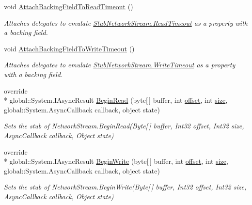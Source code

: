 \begin{DoxyCompactItemize}
void \hyperlink{class_system_1_1_net_1_1_sockets_1_1_fakes_1_1_stub_network_stream_a2c36682e43d87a26e612652ccf69ff8b}{Attach\-Backing\-Field\-To\-Read\-Timeout} ()
\begin{DoxyCompactList}\small\item\em Attaches delegates to emulate \hyperlink{class_system_1_1_net_1_1_sockets_1_1_fakes_1_1_stub_network_stream_a07da6733efea8a3e0ba75ed0d2941729}{Stub\-Network\-Stream.\-Read\-Timeout} as a property with a backing field.\end{DoxyCompactList}\item 
void \hyperlink{class_system_1_1_net_1_1_sockets_1_1_fakes_1_1_stub_network_stream_a041937a175dc32ab4657e21363c9b855}{Attach\-Backing\-Field\-To\-Write\-Timeout} ()
\begin{DoxyCompactList}\small\item\em Attaches delegates to emulate \hyperlink{class_system_1_1_net_1_1_sockets_1_1_fakes_1_1_stub_network_stream_af385e9684d56f2d579d1d7cdc3cbc1db}{Stub\-Network\-Stream.\-Write\-Timeout} as a property with a backing field.\end{DoxyCompactList}\item 
override \\*
global\-::\-System.\-I\-Async\-Result \hyperlink{class_system_1_1_net_1_1_sockets_1_1_fakes_1_1_stub_network_stream_aa4142bafd8af64e0e49e55b722991988}{Begin\-Read} (byte\mbox{[}$\,$\mbox{]} buffer, int \hyperlink{jquery-1_810_82_8js_a4a9f594d20d927164551fc7fa4751a2f}{offset}, int \hyperlink{jquery-1_810_82_8js_afa6806c6ee5e63d5177f1dcc082ba6bc}{size}, global\-::\-System.\-Async\-Callback callback, object state)
\begin{DoxyCompactList}\small\item\em Sets the stub of Network\-Stream.\-Begin\-Read(\-Byte\mbox{[}$\,$\mbox{]} buffer, Int32 offset, Int32 size, Async\-Callback callback, Object state)\end{DoxyCompactList}\item 
override \\*
global\-::\-System.\-I\-Async\-Result \hyperlink{class_system_1_1_net_1_1_sockets_1_1_fakes_1_1_stub_network_stream_a2f2303ff2f072d001202f08d42c03bd4}{Begin\-Write} (byte\mbox{[}$\,$\mbox{]} buffer, int \hyperlink{jquery-1_810_82_8js_a4a9f594d20d927164551fc7fa4751a2f}{offset}, int \hyperlink{jquery-1_810_82_8js_afa6806c6ee5e63d5177f1dcc082ba6bc}{size}, global\-::\-System.\-Async\-Callback callback, object state)
\begin{DoxyCompactList}\small\item\em Sets the stub of Network\-Stream.\-Begin\-Write(\-Byte\mbox{[}$\,$\mbox{]} buffer, Int32 offset, Int32 size, Async\-Callback callback, Object state)\end{DoxyCompactList}\item 

\end{DoxyCompactItemize}
